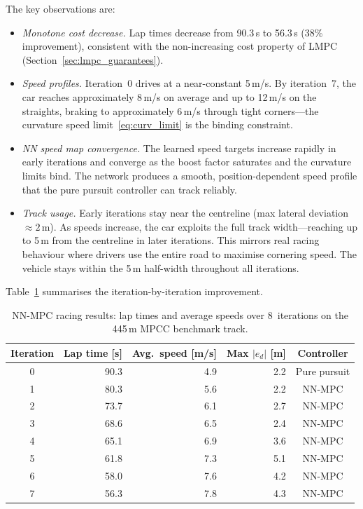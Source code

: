 The key observations are:
\begin{itemize}
	\item \emph{Monotone cost decrease.} Lap times decrease from 90.3\,s to 56.3\,s (38\% improvement), consistent with the non-increasing cost property of LMPC (Section~\ref{sec:lmpc_guarantees}).

	\item \emph{Speed profiles.} Iteration~0 drives at a near-constant 5\,m/s. By iteration~7, the car reaches approximately 8\,m/s on average and up to 12\,m/s on the straights, braking to approximately 6\,m/s through tight corners---the curvature speed limit~\eqref{eq:curv_limit} is the binding constraint.

	\item \emph{NN speed map convergence.} The learned speed targets increase rapidly in early iterations and converge as the boost factor saturates and the curvature limits bind. The network produces a smooth, position-dependent speed profile that the pure pursuit controller can track reliably.

	\item \emph{Track usage.} Early iterations stay near the centreline (max lateral deviation $\approx 2$\,m). As speeds increase, the car exploits the full track width---reaching up to 5\,m from the centreline in later iterations. This mirrors real racing behaviour where drivers use the entire road to maximise cornering speed. The vehicle stays within the 5\,m half-width throughout all iterations.
\end{itemize}

Table~\ref{tab:racing_results} summarises the iteration-by-iteration improvement.

\begin{table}[ht]
	\centering
	\caption{NN-MPC racing results: lap times and average speeds over 8~iterations on the 445\,m MPCC benchmark track.}
	\label{tab:racing_results}
	\begin{tabular}{crrrc}
		\toprule
		\textbf{Iteration} & \textbf{Lap time [s]} & \textbf{Avg.\ speed [m/s]} & \textbf{Max $|e_d|$ [m]} & \textbf{Controller} \\
		\midrule
		0 & 90.3 & 4.9 & 2.2 & Pure pursuit \\
		1 & 80.3 & 5.6 & 2.2 & NN-MPC \\
		2 & 73.7 & 6.1 & 2.7 & NN-MPC \\
		3 & 68.6 & 6.5 & 2.4 & NN-MPC \\
		4 & 65.1 & 6.9 & 3.6 & NN-MPC \\
		5 & 61.8 & 7.3 & 5.1 & NN-MPC \\
		6 & 58.0 & 7.6 & 4.2 & NN-MPC \\
		7 & 56.3 & 7.8 & 4.3 & NN-MPC \\
		\bottomrule
	\end{tabular}
\end{table}

